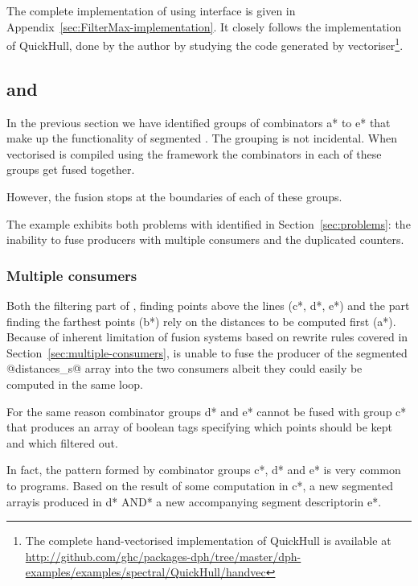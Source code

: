 \documentclass[preamble.tex]{subfiles}
\begin{document}
The complete implementation of  using \LiveFusion interface is given in Appendix~\ref{sec:FilterMax-implementation}. It closely follows the implementation of QuickHull, done by the author by studying the  code generated by \DPH vectoriser\footnote{The complete hand-vectorised implementation of QuickHull is available at \url{http://github.com/ghc/packages-dph/tree/master/dph-examples/examples/spectral/QuickHull/handvec}}.



\subsection{\StreamFusion and \FilterMax}

In the previous section we have identified groups of combinators \*a* to \*e* that make up the functionality of segmented \FilterMax. The grouping is not incidental. When vectorised \QuickHull is compiled using the \StreamFusion framework the combinators in each of these groups get fused together.

However, the fusion stops at the boundaries of each of these groups.

The \FilterMax example exhibits both problems with \StreamFusion identified in Section~\ref{sec:problems}: the inability to fuse producers with multiple consumers and the duplicated counters.


\subsubsection{Multiple consumers}

Both the filtering part of \FilterMax, finding points above the lines (\*c*, \*d*, \*e*) and the part finding the farthest points (\*b*) rely on the distances to be computed first (\*a*). Because of inherent limitation of fusion systems based on rewrite rules covered in Section~\ref{sec:multiple-consumers}, \StreamFusion is unable to fuse the producer of the segmented @distances_s@ array into the two consumers albeit they could easily be computed in the same loop.

For the same reason combinator groups \*d* and \*e* cannot be fused with group \*c* that produces an array of boolean tags specifying which points should be kept and which filtered out.

\begin{bluebox}
In fact, the pattern formed by combinator groups \*c*, \*d* and \*e* is very common to \DPH programs. Based on the result of some computation in \*c*, a new segmented array\isegarray is produced in \*d* \*AND* a new accompanying segment descriptor\isegd in \*e*.
\end{bluebox}
\end{document}
